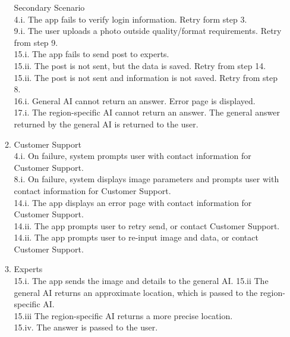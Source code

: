 \documentclass[]{article}
\begin{document}
\begin{enumerate}[{\bf BE1.}]
\begin{enumerate}[{\bf VP1.}]
                    Secondary Scenario \\
                    4.i. The app fails to verify login information. Retry form step 3. \\
                    9.i. The user uploads a photo outside quality/format requirements. Retry from step 9.\\ 
                    15.i. The app fails to send post to experts. \\
                    15.ii. The post is not sent, but the data is saved. Retry from step 14. \\
                    15.ii. The post is not sent and information is not saved. Retry from step 8. \\
                    16.i. General AI cannot return an answer. Error page is displayed. \\
                    17.i. The region-specific AI cannot return an answer. The general answer returned by the general AI is returned to the user.
                    
			\item Customer Support \\
				4.i. On failure, system prompts user with contact information for Customer Support. \\
                8.i. On failure, system displays image parameters and prompts user with contact information for Customer Support. \\
                14.i. The app displays an error page with contact information for Customer Support. \\
	            14.ii. The app prompts user to retry send, or contact Customer Support. \\
	            14.ii. The app prompts user to re-input image and data, or contact Customer Support. \\

            \item Experts\\
                15.i. The app sends the image and details to the general AI. 
                15.ii The general AI returns an approximate location, which is passed to the region-specific AI. \\
                15.iii The region-specific AI returns a more precise location. \\
                15.iv. The answer is passed to the user.
            

\end{enumerate}
\end{enumerate}
\end{document}
